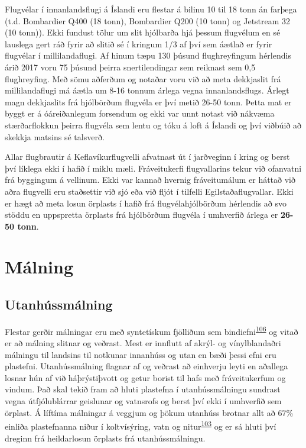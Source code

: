 \documentclass[icelandic,]{book}
\begin{document}
Flugvélar í innanlandsflugi á Íslandi eru flestar á bilinu 10 til 18 tonn án farþega (t.d. Bombardier Q400 (18 tonn), Bombardier Q200 (10 tonn) og Jetstream 32 (10 tonn)). Ekki fundust tölur um slit hjólbarða hjá þessum flugvélum en sé lauslega gert ráð fyrir að slitið sé í kringum 1/3 af því sem áætlað er fyrir flugvélar í millilandaflugi. Af hinum tæpu 130 þúsund flughreyfingum hérlendis árið 2017 voru 75 þúsund þeirra snertilendingar sem reiknast sem 0,5 flughreyfing. Með sömu aðferðum og notaðar voru við að meta dekkjaslit frá millilandaflugi má áætla um 8-16 tonnum árlega vegna innanlandsflugs. Árlegt magn dekkjaslits frá hjólbörðum flugvéla er því metið 26-50 tonn. Þetta mat er byggt er á óáreiðanlegum forsendum og ekki var unnt notast við nákvæma stærðarflokkun þeirra flugvéla sem lentu og tóku á loft á Íslandi og því viðbúið að skekkja matsins sé talsverð.

Allar flugbrautir á Keflavíkurflugvelli afvatnast út í jarðveginn í kring og berst því líklega ekki í hafið í miklu mæli. Fráveitukerfi flugvallarins tekur við ofanvatni frá byggingum á vellinum. Ekki var kannað hvernig fráveitumálum er háttað við aðra flugvelli eru staðsettir við sjó eða við fljót í tilfelli Egilstaðaflugvallar. Ekki er hægt að meta losun örplasts í hafið frá flugvélahjólbörðum hérlendis að svo stöddu en uppspretta örplasts frá hjólbörðum flugvéla í umhverfið árlega er \textbf{26-50 tonn}.

\hypertarget{malning}{%
\section*{Málning}\label{malning}}

\hypertarget{utanhussmalning}{%
\subsection*{Utanhússmálning}\label{utanhussmalning}}

Flestar gerðir málningar eru með syntetískum fjölliðum sem bindiefni\textsuperscript{\protect\hyperlink{ref-Durkin2018}{106}} og vitað er að málning slitnar og veðrast. Mest er innflutt af akrýl- og vínylblandaðri málningu til landsins til notkunar innanhúss og utan en bæði þessi efni eru plastefni. Utanhússmálning flagnar af og veðrast að einhverju leyti en aðallega losnar hún af við háþrýstiþvott og getur borist til hafs með fráveitukerfum og vindum. Það skal tekið fram að hluti plastefna í utanhússmálningu sundrast vegna útfjólublárrar geislunar og vatnsrofs og berst því ekki í umhverfið sem örplast. Á líftíma málningar á veggjum og þökum utanhúss brotnar allt að 67\% einliða plastefnanna niður í koltvísýring, vatn og nitur\textsuperscript{\protect\hyperlink{ref-Hann2018}{103}} og er sá hluti því dreginn frá heildarlosun örplasts frá utanhússmálningu.
\end{document}
